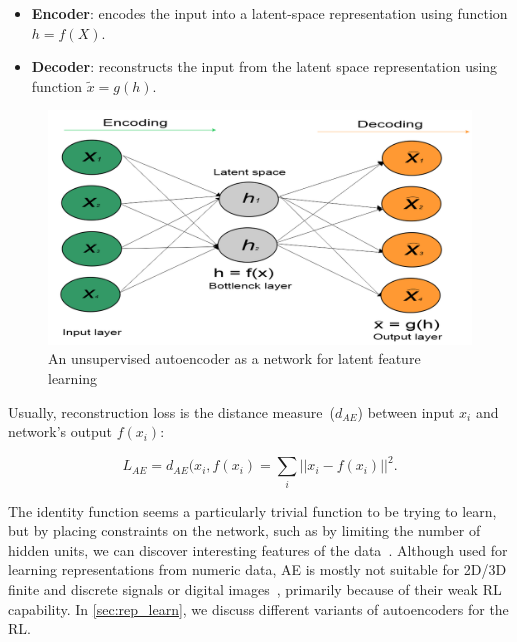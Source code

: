 \vspace{-2mm}
\begin{itemize}[noitemsep]
    \item \textbf{Encoder}: encodes the input into a latent-space representation using function $h = f(X)$.
    \item \textbf{Decoder}: reconstructs the input from the latent space representation using function $\tilde{x} = g(h)$. 
\end{itemize}
\vspace{-2mm}

\begin{figure}[h]
    \centering
    \includegraphics[scale=0.6]{images/ae.png}
    \caption[An unsupervised autoencoder as a network for latent feature learning]{An unsupervised autoencoder as a network for latent feature learning~\cite{karimDLTF2018}}
    \label{fig:ae_theory1}
    \vspace{-2mm}
\end{figure}

Usually, reconstruction loss is the distance measure~($d_{AE}$) between input $x_i$ and network's output $f(x_i)$: 

\vspace{-2mm}
\begin{equation}
    L_{AE}=\text{$d_{AE}$}(x_i, f(x_i) = \sum_{i} ||x_{i}-f(x_i)||^{2}.
    \label{eq:Loss1}
\end{equation}

\hspace*{3.5mm} The identity function seems a particularly trivial function to be trying to learn, but by placing constraints on the network, such as by limiting the number of hidden units, we can discover interesting features of the data~\cite{karimDLTF2018}. Although used for learning representations from numeric data, AE is mostly not suitable for 2D/3D finite and discrete signals or digital images~\cite{min2018survey}, primarily because of their weak RL capability. In \cref{sec:rep_learn}, we discuss different variants of autoencoders for the RL. %

